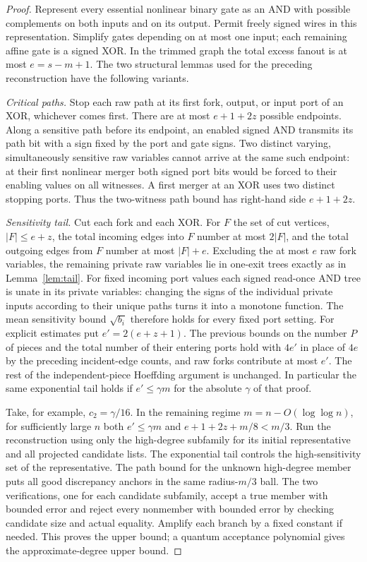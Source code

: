 \begin{proof}
Represent every essential nonlinear binary gate as an AND with possible complements on both inputs and on its output. Permit freely signed wires in this representation. Simplify gates depending on at most one input; each remaining affine gate is a signed XOR. In the trimmed graph the total excess fanout is at most $e=s-m+1$. The two structural lemmas used for the preceding reconstruction have the following variants.

\emph{Critical paths.} Stop each raw path at its first fork, output, or input port of an XOR, whichever comes first. There are at most $e+1+2z$ possible endpoints. Along a sensitive path before its endpoint, an enabled signed AND transmits its path bit with a sign fixed by the port and gate signs. Two distinct varying, simultaneously sensitive raw variables cannot arrive at the same such endpoint: at their first nonlinear merger both signed port bits would be forced to their enabling values on all witnesses. A first merger at an XOR uses two distinct stopping ports. Thus the two-witness path bound has right-hand side $e+1+2z$.

\emph{Sensitivity tail.} Cut each fork and each XOR. For $F$ the set of cut vertices, $|F|\le e+z$, the total incoming edges into $F$ number at most $2|F|$, and the total outgoing edges from $F$ number at most $|F|+e$. Excluding the at most $e$ raw fork variables, the remaining private raw variables lie in one-exit trees exactly as in Lemma~\ref{lem:tail}. For fixed incoming port values each signed read-once AND tree is unate in its private variables: changing the signs of the individual private inputs according to their unique paths turns it into a monotone function. The mean sensitivity bound $\sqrt{b_i}$ therefore holds for every fixed port setting. For explicit estimates put $e'=2(e+z+1)$. The previous bounds on the number $P$ of pieces and the total number of their entering ports hold with $4e'$ in place of $4e$ by the preceding incident-edge counts, and raw forks contribute at most $e'$. The rest of the independent-piece Hoeffding argument is unchanged. In particular the same exponential tail holds if $e'\le\gamma m$ for the absolute $\gamma$ of that proof.

Take, for example, $c_2=\gamma/16$. In the remaining regime $m=n-O(\log\log n)$, for sufficiently large $n$ both $e'\le\gamma m$ and $e+1+2z+m/8<m/3$. Run the reconstruction using only the high-degree subfamily for its initial representative and all projected candidate lists. The exponential tail controls the high-sensitivity set of the representative. The path bound for the unknown high-degree member puts all good discrepancy anchors in the same radius-$m/3$ ball. The two verifications, one for each candidate subfamily, accept a true member with bounded error and reject every nonmember with bounded error by checking candidate size and actual equality. Amplify each branch by a fixed constant if needed. This proves the upper bound; a quantum acceptance polynomial gives the approximate-degree upper bound.


\end{proof}
